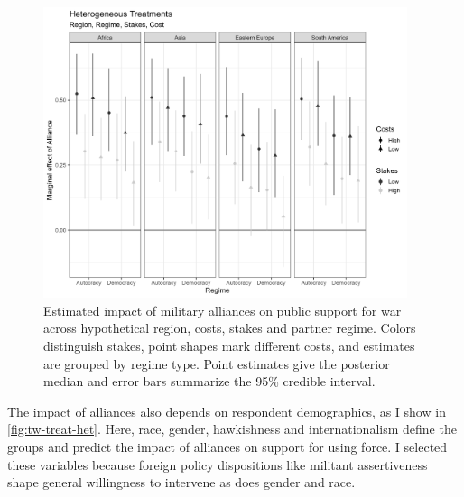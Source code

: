 \documentclass[12pt]{article}
\begin{document}
\begin{figure}[htpb]
	\centering
		\includegraphics[width=0.95\textwidth]{../figures/tw-het-treat.png}
	\caption{Estimated impact of military alliances on public support for war across hypothetical region, costs, stakes and partner regime. Colors distinguish stakes, point shapes mark different costs, and estimates are grouped by regime type. Point estimates give the posterior median and error bars summarize the 95\% credible interval.}
	\label{fig:tw-het-treat}
\end{figure}


The impact of alliances also depends on respondent demographics, as I show in \autoref{fig:tw-treat-het}. 
Here, race, gender, hawkishness and internationalism define the groups and predict the impact of alliances on support for using force. 
I selected these variables because foreign policy dispositions like militant assertiveness shape general willingness to intervene \citep{Kertzeretal2014} as does gender \citep{Barnhartetal2020} and race. 
\end{document}
